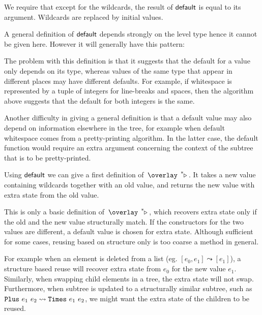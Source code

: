 We require that except for the wildcards, the result of ${\mathsf {default}}$ is equal to its argument. Wildcards are replaced by initial values.


A general definition of ${\mathsf {default}}$ depends strongly on the level type hence it cannot be given here. However it will generally have this pattern:


The problem with this definition is that it suggests that the default for a value only depends on its type, whereas values of the same type that appear in different places may have different defaults. For example, if whitespace is represented by a tuple of integers for line-breaks and spaces, then the algorithm above suggests that the default for both integers is the same.

Another difficulty in giving a general definition is that a default value may also depend on information elsewhere in the tree, for example when default whitespace comes from a pretty-printing algorithm. In the latter case, the default function would require an extra argument concerning the context of the subtree that is to be pretty-printed.

Using ${\mathsf {default}}$ we can give a first definition of $\reuzestar$. It takes a new value containing wildcards together with an old value, and returns the new value with extra state from the old value.


This is only a basic definition of $\reuzestar$, which recovers extra state only if the old and the new value structurally match. If the constructors for the two values are different, a default value is chosen for extra state. Although sufficient for some cases, reusing based on structure only is too coarse a method in general.

For example when an element is deleted from a list (eg. $[e_0, e_1] \leadsto [e_1]$), a structure based reuse will recover extra state from $e_0$ for the new value $e_1$. Similarly, when swapping child elements in a tree, the extra state will not swap. Furthermore, when subtree is updated to a structurally similar subtree, such as 
$\verb|Plus|~e_1~e_2 \leadsto \verb|Times|~e_1~e_2$, we might want the extra state of the children to be reused.

